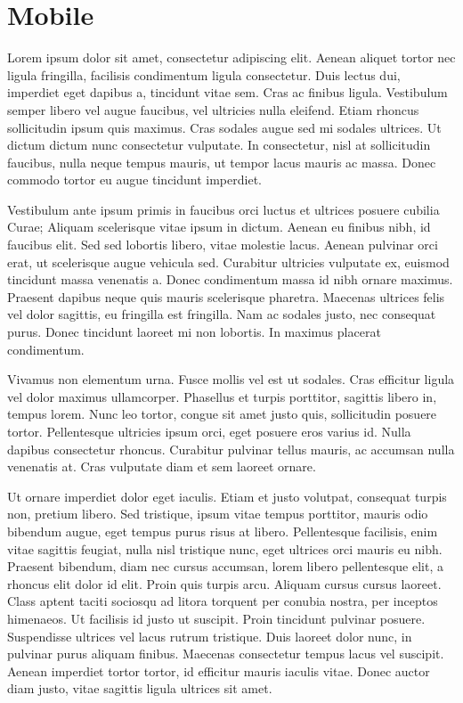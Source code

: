 \documentclass[letterpaper,10pt,english]{sphinxmanual}
\begin{document}
\chapter{Mobile}
\label{mobile::doc}\label{mobile:mobile}
Lorem ipsum dolor sit amet, consectetur adipiscing elit. Aenean aliquet tortor nec ligula fringilla, facilisis condimentum ligula consectetur. Duis lectus dui, imperdiet eget dapibus a, tincidunt vitae sem. Cras ac finibus ligula. Vestibulum semper libero vel augue faucibus, vel ultricies nulla eleifend. Etiam rhoncus sollicitudin ipsum quis maximus. Cras sodales augue sed mi sodales ultrices. Ut dictum dictum nunc consectetur vulputate. In consectetur, nisl at sollicitudin faucibus, nulla neque tempus mauris, ut tempor lacus mauris ac massa. Donec commodo tortor eu augue tincidunt imperdiet.

Vestibulum ante ipsum primis in faucibus orci luctus et ultrices posuere cubilia Curae; Aliquam scelerisque vitae ipsum in dictum. Aenean eu finibus nibh, id faucibus elit. Sed sed lobortis libero, vitae molestie lacus. Aenean pulvinar orci erat, ut scelerisque augue vehicula sed. Curabitur ultricies vulputate ex, euismod tincidunt massa venenatis a. Donec condimentum massa id nibh ornare maximus. Praesent dapibus neque quis mauris scelerisque pharetra. Maecenas ultrices felis vel dolor sagittis, eu fringilla est fringilla. Nam ac sodales justo, nec consequat purus. Donec tincidunt laoreet mi non lobortis. In maximus placerat condimentum.

Vivamus non elementum urna. Fusce mollis vel est ut sodales. Cras efficitur ligula vel dolor maximus ullamcorper. Phasellus et turpis porttitor, sagittis libero in, tempus lorem. Nunc leo tortor, congue sit amet justo quis, sollicitudin posuere tortor. Pellentesque ultricies ipsum orci, eget posuere eros varius id. Nulla dapibus consectetur rhoncus. Curabitur pulvinar tellus mauris, ac accumsan nulla venenatis at. Cras vulputate diam et sem laoreet ornare.

Ut ornare imperdiet dolor eget iaculis. Etiam et justo volutpat, consequat turpis non, pretium libero. Sed tristique, ipsum vitae tempus porttitor, mauris odio bibendum augue, eget tempus purus risus at libero. Pellentesque facilisis, enim vitae sagittis feugiat, nulla nisl tristique nunc, eget ultrices orci mauris eu nibh. Praesent bibendum, diam nec cursus accumsan, lorem libero pellentesque elit, a rhoncus elit dolor id elit. Proin quis turpis arcu. Aliquam cursus cursus laoreet. Class aptent taciti sociosqu ad litora torquent per conubia nostra, per inceptos himenaeos. Ut facilisis id justo ut suscipit. Proin tincidunt pulvinar posuere. Suspendisse ultrices vel lacus rutrum tristique. Duis laoreet dolor nunc, in pulvinar purus aliquam finibus. Maecenas consectetur tempus lacus vel suscipit. Aenean imperdiet tortor tortor, id efficitur mauris iaculis vitae. Donec auctor diam justo, vitae sagittis ligula ultrices sit amet.
\end{document}

